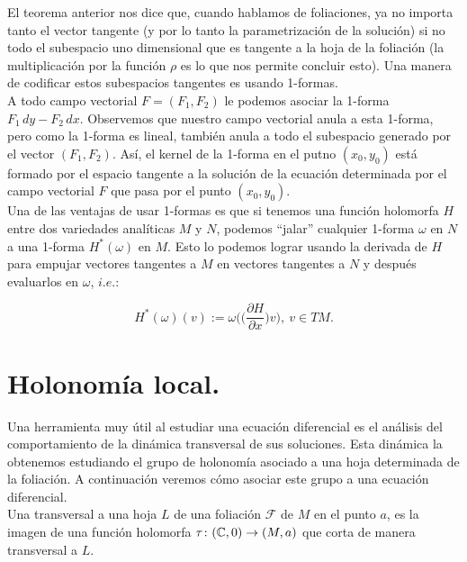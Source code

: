 El teorema anterior nos dice que, cuando hablamos de foliaciones, ya no importa tanto el vector tangente (y por lo tanto la parametrización de la solución) si no todo el subespacio uno dimensional que es tangente a la hoja de la foliación (la multiplicación por la función $\rho$ es lo que nos permite concluir esto). Una manera de codificar estos subespacios tangentes es usando 1-formas.\\

A todo campo vectorial $F=(F_{1},F_{2})$ le podemos asociar la 1-forma $F_{1}\, dy - F_{2}\, dx $. Observemos que nuestro campo vectorial anula a esta 1-forma, pero como la 1-forma es lineal, también anula a todo el subespacio generado por el vector $(F_{1},F_{2})$. Así, el kernel de la 1-forma en el putno $(x_{0},y_{0})$ está formado por el espacio tangente a la solución de la ecuación determinada por el campo vectorial $F$ que pasa por el punto $(x_{0},y_{0})$.\\

Una de las ventajas de usar 1-formas es que si tenemos una función holomorfa $H$ entre dos variedades analíticas $M$ y $N$, podemos ``jalar'' cualquier 1-forma $\omega$ en $N$ a una 1-forma $H^{*}(\omega)$ en $M$. Esto lo podemos lograr usando la derivada de $H$ para empujar vectores tangentes a $M$ en vectores tangentes a $N$ y después evaluarlos en $\omega$, $\mathit{i.e.}$:

\begin{equation*}
H^{*}(\omega)(v):=\omega\Big(\Big(\frac{\partial H}{\partial x}\Big)v\Big),\ v\in TM.
\end{equation*}

\section{Holonomía local.}

Una herramienta muy útil al estudiar una ecuación diferencial es el análisis del comportamiento de la dinámica transversal de sus soluciones. Esta dinámica la obtenemos estudiando el grupo de holonomía asociado a una hoja determinada de la foliación. A continuación veremos cómo asociar este grupo a una ecuación diferencial.\\

Una transversal a una hoja $L$ de una foliación $\mathcal{F}$ de $M$ en el punto $a$, es la imagen de una función holomorfa $\tau\colon (\mathbb{C},0)\rightarrow (M,a)$ que corta de manera transversal a $L$.\\

